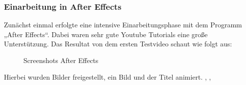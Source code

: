 \subsubsection{Einarbeitung in After Effects}
Zunächst einmal erfolgte eine intensive Einarbeitungsphase mit dem Programm „After Effects“. Dabei waren sehr gute Youtube Tutorials eine große Unterstützung. 
Das Resultat von dem ersten Testvideo schaut wie folgt aus: 
\begin{figure}[h]
\centering
\qquad
\caption{Screenshots After Effects}%
 \label{fig:Screenshots After Effect}%
\end{figure}
Hierbei wurden Bilder freigestellt, ein Bild und der Titel animiert.  \cite{After Effects Einsteigertutorial}, \cite{How to Create Cartoon Animation}, \cite{After Effects Tutorial: Logo Animations}

